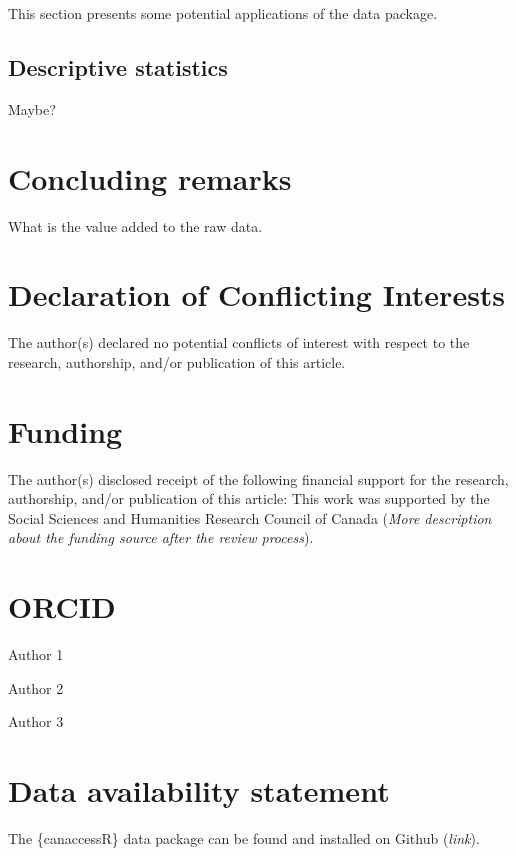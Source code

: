 \documentclass[Royal,times,sageh]{sagej}
\begin{document}
This section presents some potential applications of the data package.

\subsection{Descriptive statistics}\label{descriptive-statistics}

Maybe?

\section{Concluding remarks}\label{concluding-remarks}

What is the value added to the raw data.

\section{Declaration of Conflicting
Interests}\label{declaration-of-conflicting-interests}

The author(s) declared no potential conflicts of interest with respect
to the research, authorship, and/or publication of this article.

\section{Funding}\label{funding}

The author(s) disclosed receipt of the following financial support for
the research, authorship, and/or publication of this article: This work
was supported by the Social Sciences and Humanities Research Council of
Canada (\emph{More description about the funding source after the review
process}).

\section{ORCID}\label{orcid}

Author 1

Author 2

Author 3

\section{Data availability statement}\label{data-availability-statement}

The \{canaccessR\} data package can be found and installed on Github
(\emph{link}).



\end{document}
